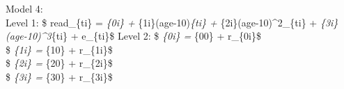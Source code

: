 \documentclass[]{article}
\newenvironment{Shaded}{\begin{snugshade}}{\end{snugshade}}
\newcommand{\KeywordTok}[1]{\textcolor[rgb]{0.13,0.29,0.53}{\textbf{#1}}}
\newcommand{\DataTypeTok}[1]{\textcolor[rgb]{0.13,0.29,0.53}{#1}}
\newcommand{\DecValTok}[1]{\textcolor[rgb]{0.00,0.00,0.81}{#1}}
\newcommand{\StringTok}[1]{\textcolor[rgb]{0.31,0.60,0.02}{#1}}
\newcommand{\OperatorTok}[1]{\textcolor[rgb]{0.81,0.36,0.00}{\textbf{#1}}}
\newcommand{\NormalTok}[1]{#1}
\begin{document}
Model 4:\\
Level 1: \$ read\_\{ti\} = \pi\emph{\{0i\} +
\pi}\{1i\}(age-10)\emph{\{ti\} + \pi}\{2i\}(age-10)\^{}2\_\{ti\} +
\pi\emph{\{3i\}(age-10)\^{}3}\{ti\} + e\_\{ti\}\$ Level 2: \$
\pi\emph{\{0i\} = \beta}\{00\} + r\_\{0i\}\$\\
\$ \pi\emph{\{1i\} = \beta}\{10\} + r\_\{1i\}\$\\
\$ \pi\emph{\{2i\} = \beta}\{20\} + r\_\{2i\}\$\\
\$ \pi\emph{\{3i\} = \beta}\{30\} + r\_\{3i\}\$

\begin{Shaded}
\end{Shaded}
\end{document}
